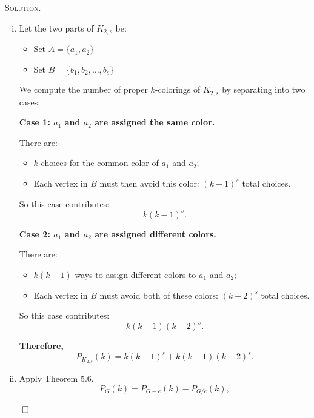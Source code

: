\documentclass[12pt, a4paper, oneside]{ctexart}
\newenvironment{solution}{%
	\par\noindent\textsc{Solution. }\ignorespaces
}{%
	\hfill$\qed$\par
}
\begin{document}
	\begin{solution}
       
        \begin{enumerate}[(i)]
            \item Let the two parts of $K_{2,s}$ be:
            \begin{itemize}
                \item Set $A = \{a_1, a_2\}$
                \item Set $B = \{b_1, b_2, \dots, b_s\}$
            \end{itemize}            
            We compute the number of proper $k$-colorings of $K_{2,s}$ by separating into two cases:
            
            \medskip
            
            \textbf{Case 1: $a_1$ and $a_2$ are assigned the same color.}
            
            There are:
            \begin{itemize}
                \item $k$ choices for the common color of $a_1$ and $a_2$;
                \item Each vertex in $B$ must then avoid this color: $(k - 1)^s$ total choices.
            \end{itemize}
            
            So this case contributes:
            \[
            k(k - 1)^s.
            \]
            
            \medskip
            
            \textbf{Case 2: $a_1$ and $a_2$ are assigned different colors.}
            
            There are:
            \begin{itemize}
                \item $k(k - 1)$ ways to assign different colors to $a_1$ and $a_2$;
                \item Each vertex in $B$ must avoid both of these colors: $(k - 2)^s$ total choices.
            \end{itemize}
            
            So this case contributes:
            \[
            k(k - 1)(k - 2)^s.
            \]
            
            \medskip
            
            \textbf{Therefore,}
            \[
            P_{K_{2,s}}(k) = k(k - 1)^s + k(k - 1)(k - 2)^s.
            \]
            \item Apply Theorem 5.6.
            \[
            P_G(k) = P_{G - e}(k) - P_{G / e}(k),
            \]
            

\end{enumerate}
\end{solution}
\end{document}
